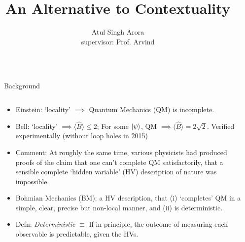 \documentclass[final,hyperref={pdfpagelabels=false}]{beamer}
\title{\huge An Alternative to Contextuality} %
\author{Atul Singh Arora \\ \small supervisor: Prof. Arvind} %
\institute{Indian Institute of Science Education \& Research (IISER), Mohali} %
\newcommand{\mean}[1]{\langle #1 \rangle}
\begin{document}

\begin{frame}[t] %

  \begin{columns}[c] %

    \begin{column}{.01\textwidth}\end{column} %
    \begin{column}{.32\textwidth} %

      \begin{block}{Background}
        \begin{columns}
          \begin{column}{0.7\textwidth}
            \begin{itemize}
            \item Einstein: `locality' $\implies$ Quantum Mechanics (QM) is incomplete. 

            \item Bell: `locality'  $\implies \mean {\hat B} \le 2$; For some $\ket{\psi}$, QM $\implies \mean{\hat B} = 2\sqrt 2$. Verified experimentally (without loop holes in 2015)

            \item Comment: At roughly the same time, various physicists had produced proofs of the claim that one can't complete QM satisfactorily, that a sensible complete `hidden variable' (HV) description of nature was impossible. 

            \item Bohmian Mechanics (BM): a HV description, that (i) `completes' QM in a simple, clear, precise but non-local manner, and (ii) is deterministic.

            \item Defn: \emph{Deterministic} $\equiv$ If in principle, the outcome of measuring each observable is predictable, given the HVs. %


\end{itemize}
\end{column}
\end{columns}
\end{block}
\end{column}
\end{columns}
\end{frame}
\end{document}
